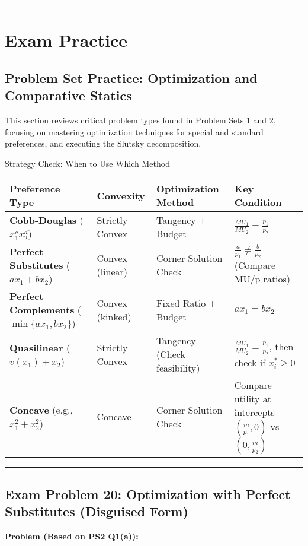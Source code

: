 \documentclass{article}
\begin{document}
\hrule
\pagebreak
\section{Exam Practice}
\subsection{Problem Set Practice: Optimization and Comparative Statics}

This section reviews critical problem types found in Problem Sets 1 and 2, focusing on mastering optimization techniques for special and standard preferences, and executing the Slutsky decomposition.

Strategy Check: When to Use Which Method

\begin{center}
\begin{tabular}{llll}
\toprule
Preference Type & Convexity & Optimization Method & Key Condition \\
\midrule
\textbf{Cobb-Douglas} ($x_1^c x_2^d$) & Strictly Convex & Tangency + Budget & $\frac{MU_1}{MU_2} = \frac{p_1}{p_2}$ \\
\textbf{Perfect Substitutes} ($a x_1 + b x_2$) & Convex (linear) & Corner Solution Check & $\frac{a}{p_1} \neq \frac{b}{p_2}$ (Compare MU/p ratios) \\
\textbf{Perfect Complements} ($\min\{a x_1, b x_2\}$) & Convex (kinked) & Fixed Ratio + Budget & $a x_1 = b x_2$ \\
\textbf{Quasilinear} ($v(x_1) + x_2$) & Strictly Convex & Tangency (Check feasibility) & $\frac{MU_1}{MU_2} = \frac{p_1}{p_2}$, then check if $x_i^* \geq 0$ \\
\textbf{Concave} (e.g., $x_1^2+x_2^2$) & Concave & Corner Solution Check & Compare utility at intercepts $\left(\frac{m}{p_1}, 0\right)$ vs $\left(0, \frac{m}{p_2}\right)$ \\
\bottomrule

\end{tabular}

\end{center}

\bigskip\noindent\rule{\linewidth}{0.4pt}\bigskip

\subsection*{\textbf{Exam Problem 20: Optimization with Perfect Substitutes (Disguised Form)}}

\textbf{Problem (Based on PS2 Q1(a)):}
\end{document}
